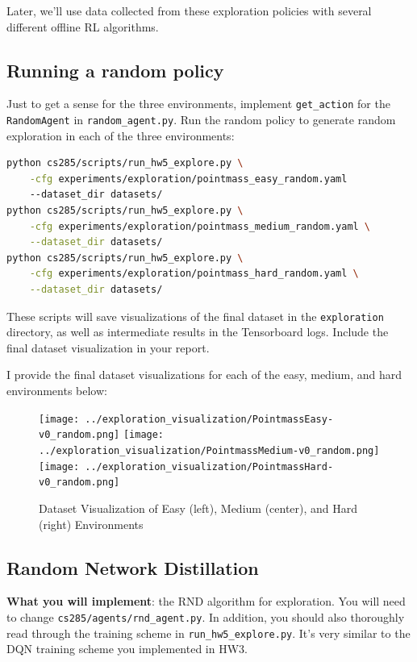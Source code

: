 \documentclass{article}
\begin{document}
Later, we'll use data collected from these exploration policies with several different offline RL algorithms.

\subsection{Running a random policy}
Just to get a sense for the three environments, implement \verb+get_action+ for the \verb+RandomAgent+ in \verb+random_agent.py+. Run the random policy to generate random exploration in each of the three environments:
\begin{lstlisting}[language=bash]
python cs285/scripts/run_hw5_explore.py \
    -cfg experiments/exploration/pointmass_easy_random.yaml
    --dataset_dir datasets/
python cs285/scripts/run_hw5_explore.py \
    -cfg experiments/exploration/pointmass_medium_random.yaml \
    --dataset_dir datasets/
python cs285/scripts/run_hw5_explore.py \
    -cfg experiments/exploration/pointmass_hard_random.yaml \
    --dataset_dir datasets/
\end{lstlisting}
These scripts will save visualizations of the final dataset in the \verb+exploration+ directory, as well as intermediate results in the Tensorboard logs. Include the final dataset visualization in your report.

\begin{sol} I provide the final dataset visualizations for each of the easy, medium, and hard environments below:
\begin{figure}[!ht]\color{darkblue}
    \begin{center}
    \texttt{[image: ../exploration\_visualization/PointmassEasy-v0\_random.png]}
    \texttt{[image: ../exploration\_visualization/PointmassMedium-v0\_random.png]}
    \texttt{[image: ../exploration\_visualization/PointmassHard-v0\_random.png]}    
\end{center}
    \caption{Dataset Visualization of Easy (left), Medium (center), and Hard (right) Environments}
\end{figure}
\end{sol}

\subsection{Random Network Distillation}
\textbf{What you will implement}: the RND algorithm for exploration. You will need to change \verb+cs285/agents/rnd_agent.py+. In addition, you should also thoroughly read through the training scheme in \verb+run_hw5_explore.py+. It's very similar to the DQN training scheme you implemented in HW3.
\end{document}
